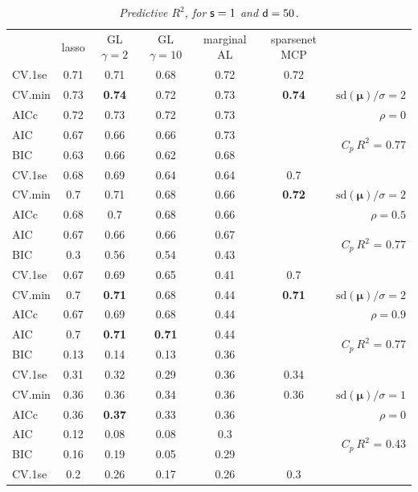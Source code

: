 \documentclass[12pt]{article}
\newcommand{\mr}[1]{\mathrm{#1}}
\newcommand{\bm}[1]{\mathbf{#1}}
\begin{document}
\begin{table}[p]\vspace{-.5cm}
\caption[l]{\it Predictive $R^2$, for ${\sf s}=1$ and  ${\sf d}=50$.}
\vspace{-.5cm}
\small{}
\begin{center}
\begin{tabular}{l*{5}{c}|r}
 & lasso & GL $\gamma=2$ & GL $\gamma=10$ & marginal AL & sparsenet MCP  &  \\
\cline{1-7}
CV.1se & 0.71 & 0.71 & 0.68 & 0.72 & 0.72 &\\
CV.min & 0.73 & {\bf 0.74} & 0.72 & 0.73 & {\bf 0.74} &  $\mr{sd}(\bm{\mu})/\sigma=2$ \\
AICc & 0.72 & 0.73 & 0.72 & 0.73 & & $\rho=0$ \\
AIC & 0.67 & 0.66 & 0.66 & 0.73 & & \multirow{2}{*}{$C_p ~ R^2$ = 0.77} \\
BIC & 0.63 & 0.66 & 0.62 & 0.68 & & \\
 \hline 
CV.1se & 0.68 & 0.69 & 0.64 & 0.64 & 0.7 &\\
CV.min & 0.7 & 0.71 & 0.68 & 0.66 & {\bf 0.72} &  $\mr{sd}(\bm{\mu})/\sigma=2$ \\
AICc & 0.68 & 0.7 & 0.68 & 0.66 & & $\rho=0.5$ \\
AIC & 0.67 & 0.66 & 0.66 & 0.67 & & \multirow{2}{*}{$C_p ~ R^2$ = 0.77} \\
BIC & 0.3 & 0.56 & 0.54 & 0.43 & & \\
 \hline 
CV.1se & 0.67 & 0.69 & 0.65 & 0.41 & 0.7 &\\
CV.min & 0.7 & {\bf 0.71} & 0.68 & 0.44 & {\bf 0.71} &  $\mr{sd}(\bm{\mu})/\sigma=2$ \\
AICc & 0.67 & 0.69 & 0.68 & 0.44 & & $\rho=0.9$ \\
AIC & 0.7 & {\bf 0.71} & {\bf 0.71} & 0.44 & & \multirow{2}{*}{$C_p ~ R^2$ = 0.77} \\
BIC & 0.13 & 0.14 & 0.13 & 0.36 & & \\
 \hline 
CV.1se & 0.31 & 0.32 & 0.29 & 0.36 & 0.34 &\\
CV.min & 0.36 & 0.36 & 0.34 & 0.36 & 0.36 &  $\mr{sd}(\bm{\mu})/\sigma=1$ \\
AICc & 0.36 & {\bf 0.37} & 0.33 & 0.36 & & $\rho=0$ \\
AIC & 0.12 & 0.08 & 0.08 & 0.3 & & \multirow{2}{*}{$C_p ~ R^2$ = 0.43} \\
BIC & 0.16 & 0.19 & 0.05 & 0.29 & & \\
 \hline 
CV.1se & 0.2 & 0.26 & 0.17 & 0.26 & 0.3 &\\

\end{tabular}
\end{center}
\end{table}
\end{document}
